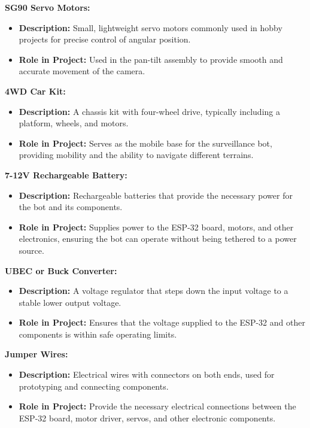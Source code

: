 \documentclass[12pt]{article}
\begin{document}
    \item \textbf{SG90 Servo Motors:}
    \begin{itemize}
        \item \textbf{Description:} Small, lightweight servo motors commonly used in hobby projects for precise control of angular position.
        \item \textbf{Role in Project:} Used in the pan-tilt assembly to provide smooth and accurate movement of the camera.
    \end{itemize}
\newpage
    \item \textbf{4WD Car Kit:}
    \begin{itemize}
        \item \textbf{Description:} A chassis kit with four-wheel drive, typically including a platform, wheels, and motors.
        \item \textbf{Role in Project:} Serves as the mobile base for the surveillance bot, providing mobility and the ability to navigate different terrains.
    \end{itemize}

    \item \textbf{7-12V Rechargeable Battery:}
    \begin{itemize}
        \item \textbf{Description:} Rechargeable batteries that provide the necessary power for the bot and its components.
        \item \textbf{Role in Project:} Supplies power to the ESP-32 board, motors, and other electronics, ensuring the bot can operate without being tethered to a power source.
    \end{itemize}

    \item \textbf{UBEC or Buck Converter:}
    \begin{itemize}
        \item \textbf{Description:} A voltage regulator that steps down the input voltage to a stable lower output voltage.
        \item \textbf{Role in Project:} Ensures that the voltage supplied to the ESP-32 and other components is within safe operating limits.
    \end{itemize}

    \item \textbf{Jumper Wires:}
    \begin{itemize}
        \item \textbf{Description:} Electrical wires with connectors on both ends, used for prototyping and connecting components.
        \item \textbf{Role in Project:} Provide the necessary electrical connections between the ESP-32 board, motor driver, servos, and other electronic components.
    \end{itemize}
\end{document}
